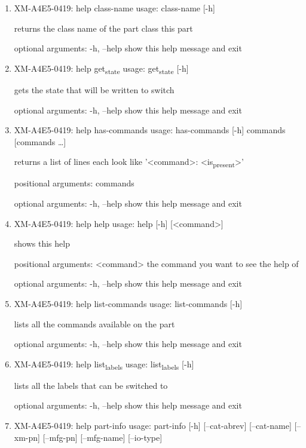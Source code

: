 \documentclass[11pt]{article}
\begin{document}
\begin{enumerate}
\item XM-A4E5-0419: help class-name
\label{sec:org868e3fd}
usage: class-name [-h]

returns the class name of the part class this part

optional arguments:
  -h, --help  show this help message and exit

\item XM-A4E5-0419: help get\textsubscript{state}
\label{sec:org619f0c7}
usage: get\textsubscript{state} [-h]

gets the state that will be written to switch

optional arguments:
  -h, --help  show this help message and exit

\item XM-A4E5-0419: help has-commands
\label{sec:orgba2c3cf}
usage: has-commands [-h] commands [commands \ldots{}]

returns a list of lines each look like '<command>: <is\textsubscript{present}>'

positional arguments:
  commands

optional arguments:
  -h, --help  show this help message and exit

\item XM-A4E5-0419: help help
\label{sec:orgc2429c5}
usage: help [-h] [<command>]

shows this help

positional arguments:
  <command>   the command you want to see the help of

optional arguments:
  -h, --help  show this help message and exit

\item XM-A4E5-0419: help list-commands
\label{sec:org7b8928a}
usage: list-commands [-h]

lists all the commands available on the part

optional arguments:
  -h, --help  show this help message and exit

\item XM-A4E5-0419: help list\textsubscript{labels}
\label{sec:org10066a7}
usage: list\textsubscript{labels} [-h]

lists all the labels that can be switched to

optional arguments:
  -h, --help  show this help message and exit

\item XM-A4E5-0419: help part-info
\label{sec:orgb669aee}
usage: part-info  [-h] [--cat-abrev] [--cat-name] [--xm-pn] [--mfg-pn] [--mfg-name]
        [--io-type]


\end{enumerate}
\end{document}
